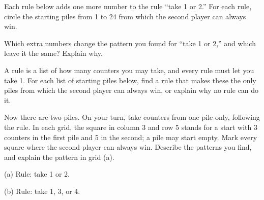 \newpage
{} Each rule below adds one more number to the rule “take 1 or 2.” For each rule, circle the starting piles from 1 to 24 from which the second player can always win.

\vspace{4mm}
\circles
\vspace{3mm}
\circles
\vspace{3mm}
\circles
\vspace{3mm}
\circles

\vspace{5mm}
Which extra numbers change the pattern you found for “take 1 or 2,” and which leave it the same? Explain why.

\newpage
{} A rule is a list of how many counters you may take, and every rule must let you take 1. For each list of starting piles below, find a rule that makes these the only piles from which the second player can always win, or explain why no rule can do it.

\vspace{6mm}
\vspace{36mm}
\vspace{36mm}
\vspace{36mm}

\newpage
{} Now there are two piles. On your turn, take counters from one pile only, following the rule. In each grid, the square in column 3 and row 5 stands for a start with 3 counters in the first pile and 5 in the second; a pile may start empty. Mark every square where the second player can always win. Describe the patterns you find, and explain the pattern in grid (a).

\vspace{7mm}
\begin{center}
\begin{minipage}[t]{8.6cm}
\centering (a) Rule: take 1 or 2.\par\vspace{4mm}
\end{minipage}\hfill
\begin{minipage}[t]{8.6cm}
\centering (b) Rule: take 1, 3, or 4.\par\vspace{4mm}
\end{minipage}
\end{center}



